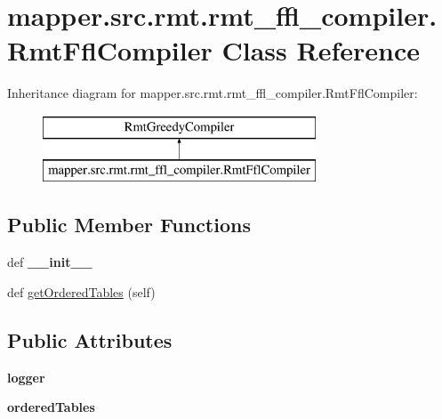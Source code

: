 \hypertarget{classmapper_1_1src_1_1rmt_1_1rmt__ffl__compiler_1_1_rmt_ffl_compiler}{}\section{mapper.\+src.\+rmt.\+rmt\+\_\+ffl\+\_\+compiler.\+Rmt\+Ffl\+Compiler Class Reference}
\label{classmapper_1_1src_1_1rmt_1_1rmt__ffl__compiler_1_1_rmt_ffl_compiler}
Inheritance diagram for mapper.\+src.\+rmt.\+rmt\+\_\+ffl\+\_\+compiler.\+Rmt\+Ffl\+Compiler\+:\begin{figure}[H]
\begin{center}
\leavevmode
\includegraphics[height=2.000000cm]{classmapper_1_1src_1_1rmt_1_1rmt__ffl__compiler_1_1_rmt_ffl_compiler}
\end{center}
\end{figure}
\subsection*{Public Member Functions}
\begin{DoxyCompactItemize}
\item 
\hypertarget{classmapper_1_1src_1_1rmt_1_1rmt__ffl__compiler_1_1_rmt_ffl_compiler_acc84be0d3963122d881a145c1ee3785f}{}def {\bfseries \+\_\+\+\_\+init\+\_\+\+\_\+}\label{classmapper_1_1src_1_1rmt_1_1rmt__ffl__compiler_1_1_rmt_ffl_compiler_acc84be0d3963122d881a145c1ee3785f}

\item 
def \hyperlink{classmapper_1_1src_1_1rmt_1_1rmt__ffl__compiler_1_1_rmt_ffl_compiler_a8e28a57bf24f9b3fa6fddf2cd130367e}{get\+Ordered\+Tables} (self)
\end{DoxyCompactItemize}
\subsection*{Public Attributes}
\begin{DoxyCompactItemize}
\item 
\hypertarget{classmapper_1_1src_1_1rmt_1_1rmt__ffl__compiler_1_1_rmt_ffl_compiler_a519fa08009da9d1b1d9085774f629acd}{}{\bfseries logger}\label{classmapper_1_1src_1_1rmt_1_1rmt__ffl__compiler_1_1_rmt_ffl_compiler_a519fa08009da9d1b1d9085774f629acd}

\item 
\hypertarget{classmapper_1_1src_1_1rmt_1_1rmt__ffl__compiler_1_1_rmt_ffl_compiler_aa3d98e304d5e0e8a9ee3e133a49da054}{}{\bfseries ordered\+Tables}\label{classmapper_1_1src_1_1rmt_1_1rmt__ffl__compiler_1_1_rmt_ffl_compiler_aa3d98e304d5e0e8a9ee3e133a49da054}

\end{DoxyCompactItemize}


